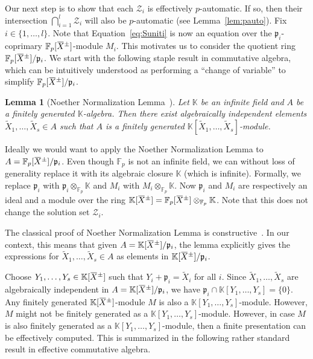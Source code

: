 \documentclass[a4paper,UKenglish,cleveref, autoref, thm-restate]{lipics-v2021}
\newcommand{\K}{\mathbb{K}}
\newcommand{\F}{\mathbb{F}}
\newcommand{\mZ}{\mathcal{Z}}
\newcommand{\oX}{\mkern 1.5mu\overline{\mkern-1.5mu X \mkern-1.5mu}\mkern 1.5mu}
\newcommand{\frp}{\mathfrak{p}}
\newtheorem{lem}[thrm]{Lemma}
\theoremstyle{definition}
\theoremstyle{definition}
\theoremstyle{definition}
\begin{document}
Our next step is to show that each $\mZ_i$ is effectively $p$-automatic.
If so, then their intersection $\bigcap_{i = 1}^l \mZ_i$ will also be $p$-automatic (see Lemma~\ref{lem:pauto}).
Fix $i \in \{1, \ldots, l\}$. Note that Equation~\eqref{eq:Suniti} is now an equation over the $\frp_i$-coprimary $\F_p[\oX^{\pm}]$-module $M_i$.
This motivates us to consider the quotient ring $\F_p[\oX^{\pm}]/\frp_i$.
We start with the following staple result in commutative algebra, which can be intuitively understood as performing a ``change of variable'' to simplify $\F_p[\oX^{\pm}]/\frp_i$.

\begin{lem}[{Noether Normalization Lemma~\cite[p.2]{mumford2004red}}]\label{lem:Noether}
    Let $\K$ be an infinite field and $A$ be a finitely generated $\K$-algebra. Then there exist algebraically independent elements $\widetilde{X}_1, \ldots, \widetilde{X}_s \in A$ such that $A$ is a finitely generated $\K[\widetilde{X}_1, \ldots, \widetilde{X}_s]$-module.
\end{lem}

Ideally we would want to apply the Noether Normalization Lemma to $A = \F_p[\oX^{\pm}]/\frp_i$. Even though $\F_p$ is not an infinite field, we can without loss of generality replace it with its algebraic closure $\K$ (which is infinite).
Formally, we replace $\frp_i$ with $\frp_i \otimes_{\F_p} \K$ and $M_i$ with $M_i \otimes_{\F_p} \K$.
Now $\frp_i$ and $M_i$ are respectively an ideal and a module over the ring $\K[\oX^{\pm}] = \F_p[\oX^{\pm}] \otimes_{\F_p} \K$. Note that this does not change the solution set $\mZ_i$.

The classical proof of Noether Normalization Lemma is constructive~\cite[p.2]{mumford2004red}.
In our context, this means that given $A = \K[\oX^{\pm}]/\frp_i$, the lemma explicitly gives the expressions for $\widetilde{X}_1, \ldots, \widetilde{X}_s \in A$ as elements in $\K[\oX^{\pm}]/\frp_i$.


Choose $Y_1, \ldots, Y_s \in \K[\oX^{\pm}]$ such that $Y_i + \frp_i = \widetilde{X}_i$ for all $i$.
Since $\widetilde{X}_1, \ldots, \widetilde{X}_s$ are algebraically independent in $A = \K[\oX^{\pm}]/\frp_i$, we have $\frp_i \cap \K[Y_1, \ldots, Y_s] = \{0\}$.
Any finitely generated $\K[\oX^{\pm}]$-module $M$ is also a $\K[Y_1, \ldots, Y_s]$-module. However, $M$ might not be finitely generated as a $\K[Y_1, \ldots, Y_s]$-module.
However, in case $M$ is also finitely generated as a $\K[Y_1, \ldots, Y_s]$-module, then a finite presentation can be effectively computed.
This is summarized in the following rather standard result in effective commutative algebra.
\end{document}

